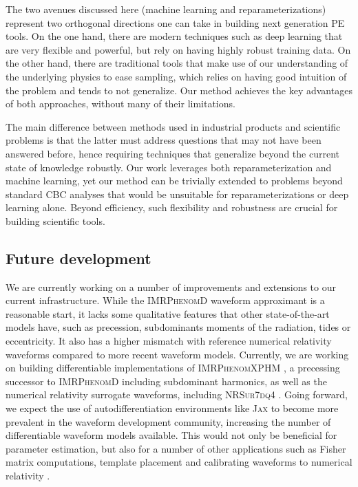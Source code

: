 \documentclass[twocolumn]{aastex631}
\begin{document}
The two avenues discussed here (machine learning and reparameterizations)
represent two orthogonal directions one can take in building next generation PE
tools. On the one hand, there are modern techniques such as deep learning that
are very flexible and powerful, but rely on having highly robust training data.
On the other hand, there are traditional tools that make use of our
understanding of the underlying physics to ease sampling, which relies
on having good intuition of the problem and tends to not generalize.
Our method achieves the key advantages of both approaches, without many of their limitations.

The main difference between methods used in industrial products and scientific
problems is that the latter must address questions that may not have been
answered before, hence requiring techniques that generalize beyond the current
state of knowledge robustly. Our work leverages both reparameterization and
machine learning, yet our method can be trivially extended to problems beyond
standard CBC analyses that would be unsuitable for reparameterizations or deep
learning alone. Beyond efficiency, such flexibility and robustness are crucial
for building scientific tools.

\subsection{Future development}

We are currently working on a number of improvements and extensions to our
current infrastructure. While the \textsc{IMRPhenomD} waveform approximant is a
reasonable start, it lacks some qualitative features that other
state-of-the-art models have, such as precession, subdominants moments of the
radiation, tides or eccentricity. It also has a higher mismatch with reference
numerical relativity waveforms compared to more recent waveform models.
Currently, we are working on building differentiable implementations of
\textsc{IMRPhenomXPHM} \citep{Pratten:2020ceb}, a precessing successor to
\textsc{IMRPhenomD} including subdominant harmonics, as well as the numerical
relativity surrogate waveforms, including \textsc{NRSur7dq4}
\citep{Varma:2018mmi}. Going forward, we expect the use of autodifferentiation
environments like \textsc{Jax} to become more prevalent in the waveform
development community, increasing the number of differentiable waveform models
available. This would not only be beneficial for parameter estimation, but also
for a number of other applications such as Fisher matrix computations, template
placement and calibrating waveforms to numerical relativity \citep{Coogan:2022qxs,Iacovelli:2022bbs,Iacovelli:2022mbg,ripplepaper}.
\end{document}
